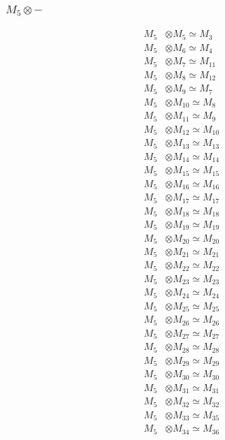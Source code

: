 \subsubsection{$ M_{5}\otimes -$}
\begin{align*}
M_{5} &\otimes M_{5} \simeq M_{3} \\
M_{5} &\otimes M_{6} \simeq M_{4} \\
M_{5} &\otimes M_{7} \simeq M_{11} \\
M_{5} &\otimes M_{8} \simeq M_{12} \\
M_{5} &\otimes M_{9} \simeq M_{7} \\
M_{5} &\otimes M_{10} \simeq M_{8} \\
M_{5} &\otimes M_{11} \simeq M_{9} \\
M_{5} &\otimes M_{12} \simeq M_{10} \\
M_{5} &\otimes M_{13} \simeq M_{13} \\
M_{5} &\otimes M_{14} \simeq M_{14} \\
M_{5} &\otimes M_{15} \simeq M_{15} \\
M_{5} &\otimes M_{16} \simeq M_{16} \\
M_{5} &\otimes M_{17} \simeq M_{17} \\
M_{5} &\otimes M_{18} \simeq M_{18} \\
M_{5} &\otimes M_{19} \simeq M_{19} \\
M_{5} &\otimes M_{20} \simeq M_{20} \\
M_{5} &\otimes M_{21} \simeq M_{21} \\
M_{5} &\otimes M_{22} \simeq M_{22} \\
M_{5} &\otimes M_{23} \simeq M_{23} \\
M_{5} &\otimes M_{24} \simeq M_{24} \\
M_{5} &\otimes M_{25} \simeq M_{25} \\
M_{5} &\otimes M_{26} \simeq M_{26} \\
M_{5} &\otimes M_{27} \simeq M_{27} \\
M_{5} &\otimes M_{28} \simeq M_{28} \\
M_{5} &\otimes M_{29} \simeq M_{29} \\
M_{5} &\otimes M_{30} \simeq M_{30} \\
M_{5} &\otimes M_{31} \simeq M_{31} \\
M_{5} &\otimes M_{32} \simeq M_{32} \\
M_{5} &\otimes M_{33} \simeq M_{35} \\
M_{5} &\otimes M_{34} \simeq M_{36} \\

\end{align*}

